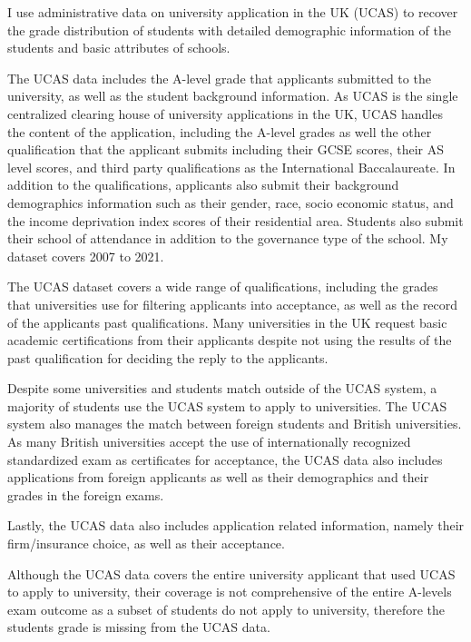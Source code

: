 
I use administrative data on university application in the UK (UCAS) to recover the grade distribution of students with detailed demographic information of the students and basic attributes of schools.

The UCAS data includes the A-level grade that applicants submitted to the university, as well as the student background information.  As UCAS is the single centralized clearing house of university applications in the UK, UCAS handles the content of the application, including the A-level grades as well the other qualification that the applicant submits including their GCSE scores, their AS level scores, and third party qualifications as the International Baccalaureate. In addition to the qualifications, applicants also submit their background demographics information such as their gender, race, socio economic status, and the income deprivation index scores of their residential area.  Students also submit their school of attendance in addition to the governance type of the school. My dataset covers 2007 to 2021.

The UCAS dataset covers a wide range of qualifications, including the grades that universities use for filtering applicants into acceptance, as well as the record of the applicants past qualifications. Many universities in the UK request basic academic certifications from their applicants despite not using the results of the past qualification for deciding the reply to the applicants. 

Despite some universities and students match outside of the UCAS system, a majority of students use the UCAS system to apply to universities. The UCAS system also manages the match between foreign students and British universities. As many British universities accept the use of internationally recognized standardized exam as certificates for acceptance, the UCAS data also includes applications from foreign applicants as well as their demographics and their grades in the foreign exams. 

Lastly, the UCAS data also includes application related information, namely their firm/insurance choice, as well as their acceptance. 



Although the UCAS data covers the entire university applicant that used UCAS to apply to university, their coverage is not comprehensive of the entire A-levels exam outcome as a subset of students do not apply to university, therefore the students grade is missing from the UCAS data. 
